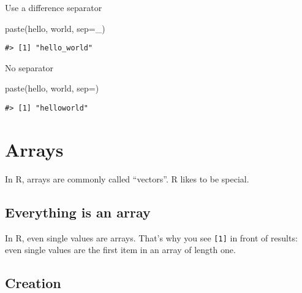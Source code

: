 \documentclass[
]{book}
\newenvironment{Shaded}{\begin{snugshade}}{\end{snugshade}}
\newcommand{\AttributeTok}[1]{\textcolor[rgb]{0.77,0.63,0.00}{#1}}
\newcommand{\FunctionTok}[1]{\textcolor[rgb]{0.00,0.00,0.00}{#1}}
\newcommand{\NormalTok}[1]{#1}
\newcommand{\StringTok}[1]{\textcolor[rgb]{0.31,0.60,0.02}{#1}}
\begin{document}
Use a difference separator

\begin{Shaded}
\begin{Highlighting}[]
\FunctionTok{paste}\NormalTok{(}\StringTok{\textquotesingle{}hello\textquotesingle{}}\NormalTok{, }\StringTok{\textquotesingle{}world\textquotesingle{}}\NormalTok{, }\AttributeTok{sep=}\StringTok{\textquotesingle{}\_\textquotesingle{}}\NormalTok{)}
\end{Highlighting}
\end{Shaded}

\begin{verbatim}
#> [1] "hello_world"
\end{verbatim}

No separator

\begin{Shaded}
\begin{Highlighting}[]
\FunctionTok{paste}\NormalTok{(}\StringTok{\textquotesingle{}hello\textquotesingle{}}\NormalTok{, }\StringTok{\textquotesingle{}world\textquotesingle{}}\NormalTok{, }\AttributeTok{sep=}\StringTok{\textquotesingle{}\textquotesingle{}}\NormalTok{)}
\end{Highlighting}
\end{Shaded}

\begin{verbatim}
#> [1] "helloworld"
\end{verbatim}

\hypertarget{arrays}{%
\chapter{Arrays}\label{arrays}}

In R, arrays are commonly called ``vectors''. R likes to be special.

\hypertarget{everything-is-an-array}{%
\section{Everything is an array}\label{everything-is-an-array}}

In R, even single values are arrays. That's why you see \texttt{{[}1{]}} in front of results: even single values are the first item in an array of length one.

\hypertarget{creation}{%
\section{Creation}\label{creation}}
\end{document}

